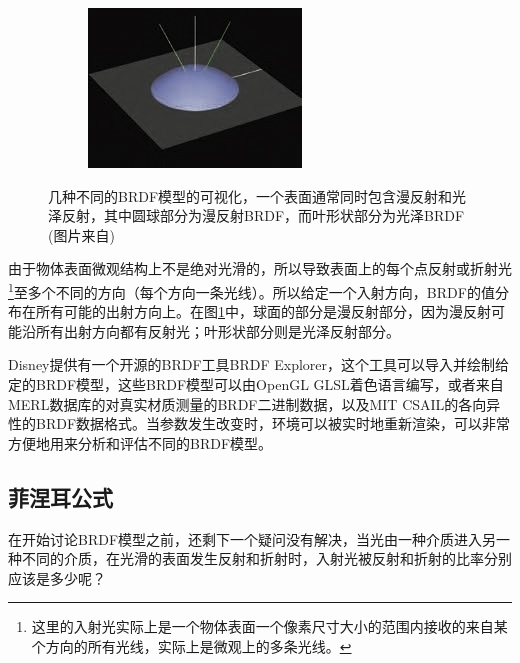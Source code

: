 \begin{figure}
\begin{fullwidth}
\begin{center}
\begin{subfigure}[b]{0.328\thewidth}
	\end{subfigure}
	\begin{subfigure}[b]{0.328\thewidth}
		\includegraphics[width=1.\textwidth]{graphics/gi/ray-optics-8-6}
	\end{subfigure}
\caption{几种不同的BRDF模型的可视化，一个表面通常同时包含漫反射和光泽反射，其中圆球部分为漫反射BRDF，而叶形状部分为光泽BRDF (图片来自\cite{m:BRDFExplorer})}
\label{f:intro-brdf-models}
\end{center}
\end{fullwidth}
\end{figure}

由于物体表面微观结构上不是绝对光滑的，所以导致表面上的每个点反射或折射光\footnote{这里的入射光实际上是一个物体表面一个像素尺寸大小的范围内接收的来自某个方向的所有光线，实际上是微观上的多条光线。}至多个不同的方向（每个方向一条光线）。所以给定一个入射方向，BRDF的值分布在所有可能的出射方向上。在图\ref{f:intro-brdf-models}中，球面的部分是漫反射部分，因为漫反射可能沿所有出射方向都有反射光；叶形状部分则是光泽反射部分。

Disney提供有一个开源的BRDF工具BRDF Explorer\cite{m:BRDFExplorer}，这个工具可以导入并绘制给定的BRDF模型，这些BRDF模型可以由OpenGL GLSL着色语言编写，或者来自MERL数据库的对真实材质测量的BRDF二进制数据，以及MIT CSAIL的各向异性的BRDF数据格式。当参数发生改变时，环境可以被实时地重新渲染，可以非常方便地用来分析和评估不同的BRDF模型。





\subsection{菲涅耳公式}\label{sec:intro-fresnel}
在开始讨论BRDF模型之前，还剩下一个疑问没有解决，当光由一种介质进入另一种不同的介质，在光滑的表面发生反射和折射时，入射光被反射和折射的比率分别应该是多少呢？

